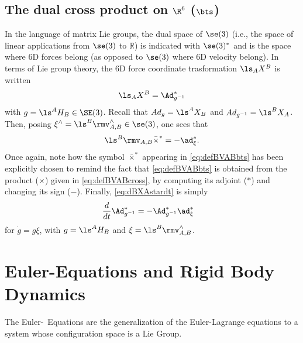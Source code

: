 \subsection{The dual cross product on $\R^6$ ($\bts$)}
\label{subsec:dualCrossProductAndLieGroups}
In the language of matrix Lie groups, the dual space of $\se(3)$ (i.e., the space of  linear applications from $\se(3)$ to $\mathbb{R}$) is indicated with $\se(3)^*$ 
and is the space where 6D forces belong (as opposed to $\se(3)$ where 6D velocity belong).
In terms of Lie group theory, 
the 6D force coordinate trasformation $\ls_AX^B$
is written 
\begin{equation}
\ls_AX^B = \Ad^*_{g^{-1}}
\end{equation}
with $g = \ls^AH_B \in \SE(3)$. 
Recall that 
$Ad_{g} = \ls^AX_B$ and
$Ad_{g^{-1}} = \ls^BX_A$.
Then, posing 
$\xi^\wedge = \ls^B\rmv_{A,B}^\wedge \in \se(3)$, one sees that 
\begin{align}
\ls^B\rmv_{A,B} \bar\times^* =
-\ad^*_\xi .
\end{align}
Once again, note how the symbol $\bar\times^*$ appearing in \eqref{eq:defBVABbts} has been explicitly chosen to remind the fact that \eqref{eq:defBVABbts} is obtained from the product ($\times$) given
in \eqref{eq:defBVABcross}, by
computing its adjoint ($*$) and
changing its sign ($-$). Finally,
\eqref{eq:dBXAstardt} is simply
\begin{align}
  \frac{d}{dt} \Ad^*_{g^{-1}} 
  & =
  - \Ad^*_{g^{-1}} 
  \ad^*_\xi
\end{align}
for $\dot g = g \xi$, 
with $g = \ls^AH_B$ and $\xi = \ls^B\rmv_{A,B}^\wedge$. 

\section{Euler-\Poincare Equations and Rigid Body Dynamics}
The Euler-\Poincare \ Equations are the generalization of the Euler-Lagrange equations to a system whose configuration space is a Lie Group. 

